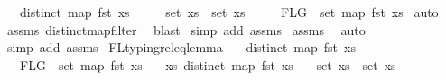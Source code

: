 \begin{isabellebody}
\ \ \ {\isachardoublequoteopen}{\isacharparenleft}{\kern0pt}distinct\ {\isacharparenleft}{\kern0pt}map\ fst\ xs{}{\isacharparenright}{\kern0pt}\isanewline
\ \ \ \ {\isasymand}\ set\ xs{}\ {\isasymsubseteq}\ set\ xs\isanewline
\ \ \ \ {\isasymand}\ FLG\ {\isacharequal}{\kern0pt}\ set\ {\isacharparenleft}{\kern0pt}map\ fst\ xs{}{\isacharparenright}{\kern0pt}{\isacharparenright}{\kern0pt}{\isachardoublequoteclose}\isanewline
%
\isadelimproof
%
\endisadelimproof
%
\isatagproof
{}\isamarkupfalse%
\ auto\isanewline
{}\isamarkupfalse%
\ assms{\isacharparenleft}{\kern0pt}{}{\isacharcomma}{\kern0pt}{}{\isacharparenright}{\kern0pt}\ distinct{\isacharunderscore}{\kern0pt}map{\isacharunderscore}{\kern0pt}filter\ \isamarkupfalse%
\ blast\isanewline
{}\isamarkupfalse%
\ {\isacharparenleft}{\kern0pt}simp\ add{\isacharcolon}{\kern0pt}\ assms{\isacharparenleft}{\kern0pt}{}{\isacharparenright}{\kern0pt}{\isacharparenright}{\kern0pt}\isanewline
{}\isamarkupfalse%
\ assms{\isacharparenleft}{\kern0pt}{}{\isacharcomma}{\kern0pt}{}{\isacharparenright}{\kern0pt}\ \isamarkupfalse%
\ auto{\isacharbrackleft}{\kern0pt}{}{\isacharbrackright}{\kern0pt}\isanewline
{}\isamarkupfalse%
\ {\isacharparenleft}{\kern0pt}simp\ add{\isacharcolon}{\kern0pt}\ assms{\isacharparenleft}{\kern0pt}{}{\isacharparenright}{\kern0pt}{\isacharparenright}{\kern0pt}%
\endisatagproof
{\isafoldproof}%
%
\isadelimproof
\isanewline
%
\endisadelimproof
\isanewline
\isanewline
{}\isamarkupfalse%
\ FL{\isacharunderscore}{\kern0pt}typing{\isacharunderscore}{\kern0pt}rel{\isacharunderscore}{\kern0pt}eq{\isacharunderscore}{\kern0pt}lemma{}{\isacharcolon}{\kern0pt}\isanewline
\ \ \ {\isachardoublequoteopen}distinct\ {\isacharparenleft}{\kern0pt}map\ fst\ xs{\isacharparenright}{\kern0pt}{\isachardoublequoteclose}\isanewline
\ \ \ {\isachardoublequoteopen}FLG\ {\isasymsubseteq}\ set\ {\isacharparenleft}{\kern0pt}map\ fst\ xs{\isacharparenright}{\kern0pt}{\isachardoublequoteclose}\isanewline
\ \ \ {\isachardoublequoteopen}{\isasymexists}xs{}{\isachardot}{\kern0pt}\ {\isacharparenleft}{\kern0pt}distinct\ {\isacharparenleft}{\kern0pt}map\ fst\ xs{}{\isacharparenright}{\kern0pt}\isanewline
\ \ {\isasymand}\ set\ xs{}\ {\isasymsubseteq}\ set\ xs\isanewline

\end{isabellebody}
